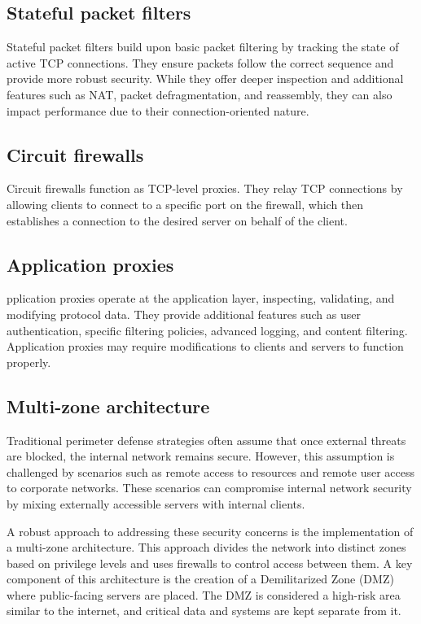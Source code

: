 \subsection{Stateful packet filters}
Stateful packet filters build upon basic packet filtering by tracking the state of active TCP connections. 
They ensure packets follow the correct sequence and provide more robust security.
While they offer deeper inspection and additional features such as NAT, packet defragmentation, and reassembly, they can also impact performance due to their connection-oriented nature.

\subsection{Circuit firewalls}
Circuit firewalls function as TCP-level proxies. 
They relay TCP connections by allowing clients to connect to a specific port on the firewall, which then establishes a connection to the desired server on behalf of the client.

\subsection{Application proxies}
pplication proxies operate at the application layer, inspecting, validating, and modifying protocol data. 
They provide additional features such as user authentication, specific filtering policies, advanced logging, and content filtering. 
Application proxies may require modifications to clients and servers to function properly.

\subsection{Multi-zone architecture}
Traditional perimeter defense strategies often assume that once external threats are blocked, the internal network remains secure. 
However, this assumption is challenged by scenarios such as remote access to resources and remote user access to corporate networks. 
These scenarios can compromise internal network security by mixing externally accessible servers with internal clients.

A robust approach to addressing these security concerns is the implementation of a multi-zone architecture. 
This approach divides the network into distinct zones based on privilege levels and uses firewalls to control access between them. 
A key component of this architecture is the creation of a Demilitarized Zone (DMZ) where public-facing servers are placed. 
The DMZ is considered a high-risk area similar to the internet, and critical data and systems are kept separate from it.

